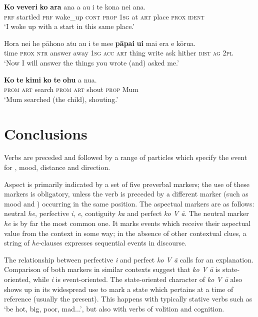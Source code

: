 \ea\label{ex:7.190}
\gll \textbf{Ko} \textbf{veveri} \textbf{ko} \textbf{{\ꞌ}ara} {\ꞌ}ana a au {\ꞌ}i te kona nei {\ꞌ}ana. \\
\textsc{prf} startled \textsc{prf} wake\_up \textsc{cont} \textsc{prop} \textsc{1sg} at \textsc{art} place \textsc{prox} \textsc{ident} \\

\glt 
‘I woke up with a start in this same place.’ \textstyleExampleref{[R539-1.764]}
\z

\ea\label{ex:7.191}
\gll Hora nei he pāhono atu au i te me{\ꞌ}e \textbf{pāpa{\ꞌ}i} \textbf{{\ꞌ}ui} mai era e kōrua.\\
time \textsc{prox} \textsc{ntr} answer away \textsc{1sg} \textsc{acc} \textsc{art} thing write ask hither \textsc{dist} \textsc{ag} \textsc{2pl}\\

\glt 
‘Now I will answer the things you wrote (and) asked me.’ \textstyleExampleref{[1 Cor. 7:1]}
\z

\ea\label{ex:7.192}
\gll \textbf{Ko} \textbf{te} \textbf{kimi} \textbf{ko} \textbf{te} \textbf{ohu} a nua. \\
\textsc{prom} \textsc{art} search \textsc{prom} \textsc{art} shout \textsc{prop} Mum \\

\glt 
‘Mum searched (the child), shouting.’ \textstyleExampleref{[R236.082]} 
\z
{}
\section{Conclusions}\label{sec:7.8}

Verbs are preceded and followed by a range of particles which specify the event for , mood, distance and direction. 

Aspect is primarily indicated by a set of five preverbal markers; the use of these markers is obligatory, unless the verb is preceded by a different marker (such as mood and ) occurring in the same position. The aspectual markers are as follows: neutral \textit{he}, perfective \textit{i},  \textit{e}, contiguity \textit{ka} and perfect \textit{ko V {\ꞌ}ā}. The neutral marker \textit{he} is by far the most common one. It marks events which receive their aspectual value from the context in some way; in the absence of other contextual clues, a string of \textit{he-}clauses expresses sequential events in discourse.

The relationship between perfective \textit{i} and perfect \textit{ko V {\ꞌ}ā} calls for an explanation. Comparison of both markers in similar contexts suggest that \textit{ko V {\ꞌ}ā} is state-oriented, while \textit{i} is event-oriented. The state-oriented character of \textit{ko V {\ꞌ}ā} also shows up in its widespread use to mark a state which pertains at a time of reference (usually the present). This happens with typically stative verbs such as ‘be hot, big, poor, mad...’, but also with verbs of volition and cognition.


